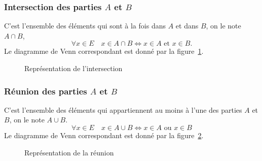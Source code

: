 \subsubsection{Intersection des parties $A$ et $B$}
\label{chap3-subsubsec:intersection}
C'est l'ensemble des éléments qui sont à la fois dans $A$ et dans $B$, on le note $A \cap B$,
\begin{equation}
  \forall x \in E \quad x \in A \cap B \iff x \in A \text{~et~} x \in B.
\end{equation}
Le diagramme de Venn correspondant est donné par la figure~\ref{chap3-fig:inter}.
\begin{figure}[h]
\centering
{}
\caption{Représentation de l'intersection}
\label{chap3-fig:inter}
\end{figure}
%
\subsubsection{Réunion des parties $A$ et $B$}
\label{chap3-subsubsec:reunion}
C'est l'ensemble des éléments qui appartiennent au moins à l'une des parties $A$ et $B$, on le note $A \cup B$.
\begin{equation}
  \forall x \in E \quad x \in A \cup B \iff x \in A \text{~ou~} x \in B
\end{equation}
Le diagramme de Venn correspondant est donné par la figure~\ref{chap3-fig:reunion}.
\begin{figure}[h]
\centering
{}
\caption{Représentation de la réunion}
\label{chap3-fig:reunion}
\end{figure}

